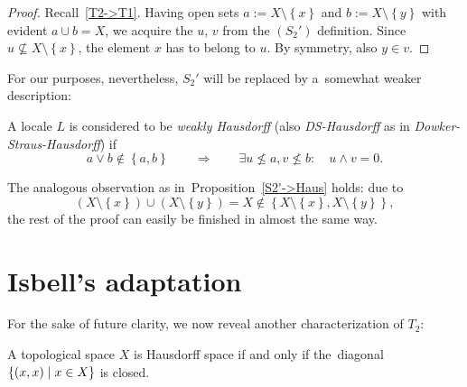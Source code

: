 \begin{proof}
  Recall~\ref{T2->T1}.
  Having open sets $a := X \setminus \left\{x\right\}$ and $b := X \setminus
  \left\{y\right\}$ with evident $a \cup b = X$, we acquire the $u$, $v$ from
  the $(S_2')$ definition.
  Since $u\not\subseteq X\setminus \left\{x\right\}$, the element $x$ has to
  belong to $u$.
  By symmetry, also $y \in v$.
\end{proof}

For our purposes, nevertheless, $S_2'$ will be replaced by a~somewhat weaker
description:

\begin{framed}
  \begin{df}[DS-Haus]
    A locale $L$ is considered to be \emph{weakly Hausdorff\/} (also
    \emph{DS-Hausdorff} as in \emph{Dowker-Straus-Hausdorff}) if
    \[
      a \vee b \not\in \left\{a, b\right\} \qquad \Rightarrow \qquad \exists
      u\not\leq a, v\not\leq b: \quad u \wedge v = 0.
    \]
  \end{df}
\end{framed}

\begin{rem}
  The analogous observation as in~Proposition~\ref{S2'->Haus} holds:
  due to
  \[
    (X \setminus \left\{x\right\}) \cup (X \setminus \left\{y\right\}) = X
    \not\in \left\{X \setminus \left\{x\right\}, X \setminus \left\{y\right\}
    \right\},
  \]
  the rest of the proof can easily be finished in almost the same way.
\end{rem}

\section{Isbell's adaptation}

For the sake of future clarity, we now reveal another characterization of
$T_2$:

\begin{prop}
  A topological space $X$ is Hausdorff space if and only if the~diagonal
  $\left\{(x, x) \mid x\in X \right\}$ is closed.
\end{prop}

